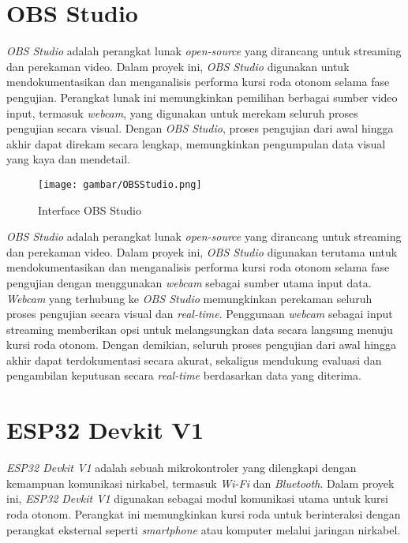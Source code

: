 \section{OBS Studio}
\label{sec:OBS Studio}

\emph{OBS Studio} adalah perangkat lunak \emph{open-source} yang dirancang untuk streaming dan perekaman video. Dalam proyek ini, \emph{OBS Studio} digunakan untuk mendokumentasikan dan menganalisis performa kursi roda otonom selama fase pengujian. Perangkat lunak ini memungkinkan pemilihan berbagai sumber video input, termasuk \emph{webcam}, yang digunakan untuk merekam seluruh proses pengujian secara visual. Dengan \emph{OBS Studio}, proses pengujian dari awal hingga akhir dapat direkam secara lengkap, memungkinkan pengumpulan data visual yang kaya dan mendetail.

\begin{figure}[H]
  \centering
  \texttt{[image: gambar/OBSStudio.png]}
  \caption{Interface OBS Studio}
  \label{fig:Gambar OBS}
\end{figure}

\emph{OBS Studio} adalah perangkat lunak \emph{open-source} yang dirancang untuk streaming dan perekaman video. Dalam proyek ini, \emph{OBS Studio} digunakan terutama untuk mendokumentasikan dan menganalisis performa kursi roda otonom selama fase pengujian dengan menggunakan \emph{webcam} sebagai sumber utama input data. \emph{Webcam} yang terhubung ke \emph{OBS Studio} memungkinkan perekaman seluruh proses pengujian secara visual dan \emph{real-time}. Penggunaan \emph{webcam} sebagai input streaming memberikan opsi untuk melangsungkan data secara langsung menuju kursi roda otonom. Dengan demikian, seluruh proses pengujian dari awal hingga akhir dapat terdokumentasi secara akurat, sekaligus mendukung evaluasi dan pengambilan keputusan secara \emph{real-time} berdasarkan data yang diterima.

\section{ESP32 Devkit V1}
\label{sec:ESP32 Devkit V1}

\emph{ESP32 Devkit V1} adalah sebuah mikrokontroler yang dilengkapi dengan kemampuan komunikasi nirkabel, termasuk \emph{Wi-Fi} dan \emph{Bluetooth}. Dalam proyek ini, \emph{ESP32 Devkit V1} digunakan sebagai modul komunikasi utama untuk kursi roda otonom. Perangkat ini memungkinkan kursi roda untuk berinteraksi dengan perangkat eksternal seperti \emph{smartphone} atau komputer melalui jaringan nirkabel.

